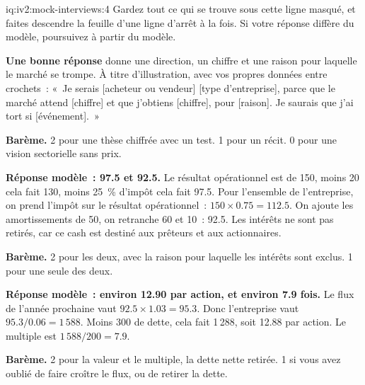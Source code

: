 \begin{solution}{iq:iv2:mock-interviews:4}
Gardez tout ce qui se trouve sous cette ligne masqué, et faites descendre la feuille d'une ligne d'arrêt à la fois. Si votre réponse diffère du modèle, poursuivez à partir du modèle.

\ivstop
\textbf{Une bonne réponse} donne une direction, un chiffre et une raison pour laquelle le marché se trompe. À titre d'illustration, avec vos propres données entre crochets~: «~Je serais [acheteur ou vendeur] [type d'entreprise], parce que le marché attend [chiffre] et que j'obtiens [chiffre], pour [raison]. Je saurais que j'ai tort si [événement].~»

\textbf{Barème.} 2 pour une thèse chiffrée avec un test. 1 pour un récit. 0 pour une vision sectorielle sans prix.

\ivstop
\textbf{Réponse modèle~: 97.5 et 92.5.} Le résultat opérationnel est de 150, moins 20 cela fait 130, moins 25~\% d'impôt cela fait 97.5. Pour l'ensemble de l'entreprise, on prend l'impôt sur le résultat opérationnel~: $150 \times 0.75 = 112.5$. On ajoute les amortissements de 50, on retranche 60 et 10~: 92.5. Les intérêts ne sont pas retirés, car ce cash est destiné aux prêteurs et aux actionnaires.

\textbf{Barème.} 2 pour les deux, avec la raison pour laquelle les intérêts sont exclus. 1 pour une seule des deux.

\ivstop
\textbf{Réponse modèle~: environ 12.90 par action, et environ 7.9 fois.} Le flux de l'année prochaine vaut $92.5 \times 1.03 = 95.3$. Donc l'entreprise vaut $95.3/0.06 = 1\,588$. Moins 300 de dette, cela fait 1\,288, soit 12.88 par action. Le multiple est $1\,588/200 = 7.9$.

\textbf{Barème.} 2 pour la valeur et le multiple, la dette nette retirée. 1 si vous avez oublié de faire croître le flux, ou de retirer la dette.


\end{solution}

